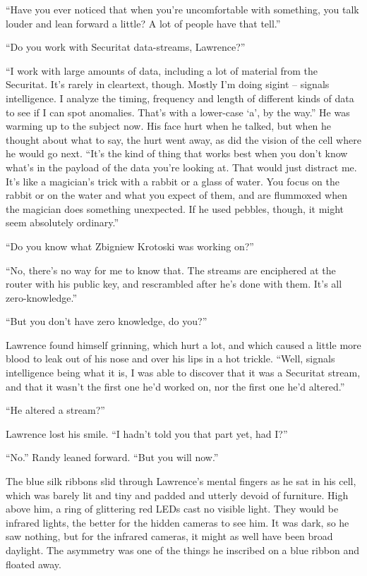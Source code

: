 “Have you ever noticed that when you're uncomfortable with something, 
you talk louder and lean forward a little? A lot of people have that 
tell.”

“Do you work with Securitat data-streams, Lawrence?”

“I work with large amounts of data, including a lot of material from 
the Securitat. It's rarely in cleartext, though. Mostly I'm doing 
sigint -- signals intelligence. I analyze the timing, frequency and 
length of different kinds of data to see if I can spot anomalies. 
That's with a lower-case `a', by the way.” He was warming up to the 
subject now. His face hurt when he talked, but when he thought about 
what to say, the hurt went away, as did the vision of the cell where he 
would go next. “It's the kind of thing that works best when you don't 
know what's in the payload of the data you're looking at. That would 
just distract me. It's like a magician's trick with a rabbit or a glass 
of water. You focus on the rabbit or on the water and what you expect 
of them, and are flummoxed when the magician does something unexpected. 
If he used pebbles, though, it might seem absolutely ordinary.”

“Do you know what Zbigniew Krotoski was working on?”

“No, there's no way for me to know that. The streams are enciphered 
at the router with his public key, and rescrambled after he's done with 
them. It's all zero-knowledge.”

“But you don't have zero knowledge, do you?”

Lawrence found himself grinning, which hurt a lot, and which caused a 
little more blood to leak out of his nose and over his lips in a hot 
trickle. “Well, signals intelligence being what it is, I was able to 
discover that it was a Securitat stream, and that it wasn't the first 
one he'd worked on, nor the first one he'd altered.”

“He altered a stream?”

Lawrence lost his smile. “I hadn't told you that part yet, had I?”

“No.” Randy leaned forward. “But you will now.”

\tb

The blue silk ribbons slid through Lawrence's mental fingers as he sat 
in his cell, which was barely lit and tiny and padded and utterly 
devoid of furniture. High above him, a ring of glittering red LEDs cast 
no visible light. They would be infrared lights, the better for the 
hidden cameras to see him. It was dark, so he saw nothing, but for the 
infrared cameras, it might as well have been broad daylight. The 
asymmetry was one of the things he inscribed on a blue ribbon and 
floated away.

